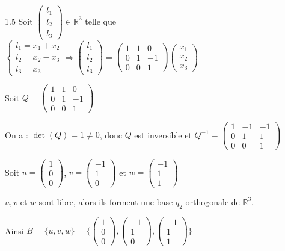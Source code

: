\documentclass[12pt]{article}
\begin{document}
\begin{spacing}{1.5}
Soit $\begin{pmatrix}
l_1 \\ 
l_2 \\ 
l_3
\end{pmatrix}\in \mathbb{R}^3$ telle que $\begin{cases}
l_1= x_1+x_2\\ 
l_2 =x_2-x_3\\ 
l_3=x_3
\end{cases}
\Longrightarrow \begin{pmatrix}
l_1 \\ 
l_2 \\ 
l_3
\end{pmatrix}=\begin{pmatrix}
1 & 1 & 0 \\ 
0 & 1 & -1 \\ 
0 & 0 & 1
\end{pmatrix}\begin{pmatrix}
x_1 \\ 
x_2 \\ 
x_3
\end{pmatrix}$

Soit $Q=\begin{pmatrix}
1 & 1 & 0 \\ 
0 & 1 & -1 \\ 
0 & 0 & 1
\end{pmatrix}$

On a : $\det(Q)=1\neq 0$, donc $Q$ est inversible et $Q^{-1}=\begin{pmatrix}
1 & -1 & -1 \\ 
0 & 1 & 1 \\ 
0 & 0 & 1
\end{pmatrix}$

Soit $u=\begin{pmatrix}
1\\ 
0 \\ 
0
\end{pmatrix}$, $v=\begin{pmatrix}
-1\\ 
1 \\ 
0
\end{pmatrix}$ et $w=\begin{pmatrix}
-1\\ 
1 \\ 
1
\end{pmatrix}$

$u, v$ et $w$ sont libre, alors ils forment une base $q_2$-orthogonale de $\mathbb{R}^3$.

Ainsi $B=\{u,v,w\}=\{\begin{pmatrix}
1\\ 
0 \\ 
0
\end{pmatrix},  \begin{pmatrix}
-1\\ 
1 \\ 
0
\end{pmatrix}, 
\begin{pmatrix}
-1\\ 
1 \\ 
1
\end{pmatrix}\}$


\end{spacing}
\end{document}
